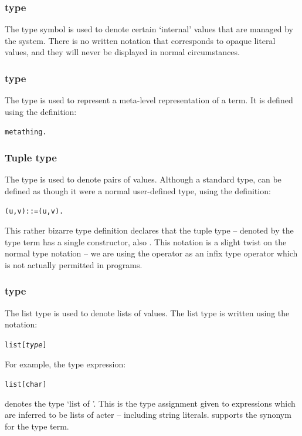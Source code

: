 \subsubsection{ type}
\label{types:standard:opaque}
The  type symbol is used to denote certain `internal' values that are managed by the \go system. There is no written notation that corresponds to opaque literal values, and they will never be displayed in normal circumstances.

\subsubsection{ type}
\label{types:standard:meta}

The  type is used to represent a meta-level representation of a term. It is defined using the definition:
\begin{alltt}
meta \impl thing.
\end{alltt}

\subsubsection{Tuple type}
\label{types:standard:tuple}

The \q{,} type is used to denote pairs of values. Although a standard type, \q{,} can be defined as though it were a normal user-defined type, using the definition:
\begin{alltt}
(u,v) ::= (u,v).
\end{alltt}
This rather bizarre type definition declares that the tuple type -- denoted by the type term  has a single constructor, also . This notation is a slight twist on the normal type notation -- we are using the \q{,} operator as an infix type operator which is not actually permitted in programs.

\subsubsection{ type}
\label{types:standard:list}

The list type is used to denote lists of values. The list type is written using the notation:
\begin{alltt}
list[\emph{type}]
\end{alltt}
For example, the type expression:
\begin{alltt}
list[char]
\end{alltt}
denotes the type `list of '. This is the type assignment given to expressions which are inferred to be lists of acter -- including string literals. \go supports the  synonym for the  type term.

